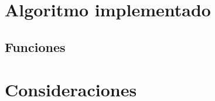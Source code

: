 \documentclass{article}
\begin{document}
\section{Algoritmo implementado}
\label{implementado}
    \begin{flushleft}
    
    \subsection{Funciones}
    \begin{flushleft}
    
    \vspace*{0.3cm}
        
    \end{flushleft}
    \end{flushleft}
    
    \vspace*{0.1cm}
    
\section{Consideraciones}
\label{consideraciones}
    \begin{flushleft}
        
    \end{flushleft}
    \vspace*{2cm}
\newpage    
    

\vfill
\vspace*{0.5cm}

\end{document}
